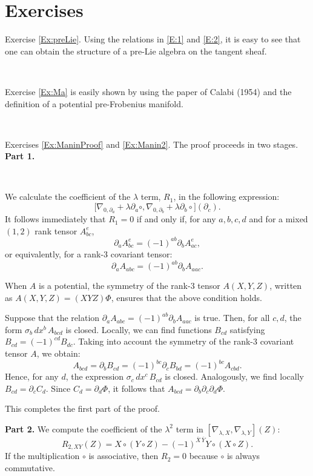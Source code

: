 \section{Exercises}
Exercise \ref{Ex:preLie}. Using the relations in \eqref{E:1} and \eqref{E:2}, it is easy to see that one can obtain the structure of a pre-Lie algebra on the tangent sheaf.

\, 

Exercise \ref{Ex:Ma} is easily shown by using the paper of Calabi (1954)\cite{Ca54} and the definition of a potential pre-Frobenius manifold.

\,

Exercises \ref{Ex:ManinProof} and \ref{Ex:Manin2}. The proof proceeds in two stages.
\noindent\textbf{Part 1.}  

\, 

We calculate the coefficient of the $\lambda$ term, $R_1$, in the following expression:
\[
\big[\nabla_{0, \partial_a} + \lambda \partial_a \circ, \nabla_{0, \partial_b} + \lambda \partial_b \circ\big](\partial_c).
\]
It follows immediately that $R_1 = 0$ if and only if, for any $a, b, c, d$ and for a mixed $(1, 2)$ rank tensor $A_{bc}^e$,  
\[
\partial_a A_{bc}^e = (-1)^{ab} \partial_b A_{ac}^e,
\]
or equivalently, for a rank-3 covariant tensor:
\[
\partial_a A_{abc} = (-1)^{ab} \partial_b A_{aac}.
\]

When $A$ is a potential, the symmetry of the rank-3 tensor $A(X, Y, Z)$, written as $A(X, Y, Z) = (XYZ)\Phi$, ensures that the above condition holds.

Suppose that the relation $\partial_a A_{abc} = (-1)^{ab} \partial_b A_{aac}$ is true. Then, for all $c, d$, the form $\sigma_b \, dx^b \, A_{bcd}$ is closed. Locally, we can find functions $B_{cd}$ satisfying $B_{cd} = (-1)^{cd} B_{dc}$. Taking into account the symmetry of the rank-3 covariant tensor $A$, we obtain:
\[
A_{bcd} = \partial_b B_{cd} = (-1)^{bc} \partial_c B_{bd} = (-1)^{bc} A_{cbd}.
\]
Hence, for any $d$, the expression $\sigma_c \, dx^c \, B_{cd}$ is closed. Analogously, we find locally $B_{cd} = \partial_c C_d$. Since $C_d = \partial_d \Phi$, it follows that $A_{bcd} = \partial_b \partial_c \partial_d \Phi$.

This completes the first part of the proof.

\noindent\textbf{Part 2.}  
We compute the coefficient of the $\lambda^2$ term in $[\nabla_{\lambda, X}, \nabla_{\lambda, Y}](Z)$:
\[
R_{2, XY}(Z) = X \circ (Y \circ Z) - (-1)^{\overline{X}\, \overline{Y}} Y \circ (X \circ Z).
\]
If the multiplication $\circ$ is associative, then $R_2 = 0$ because $\circ$ is always commutative. 

